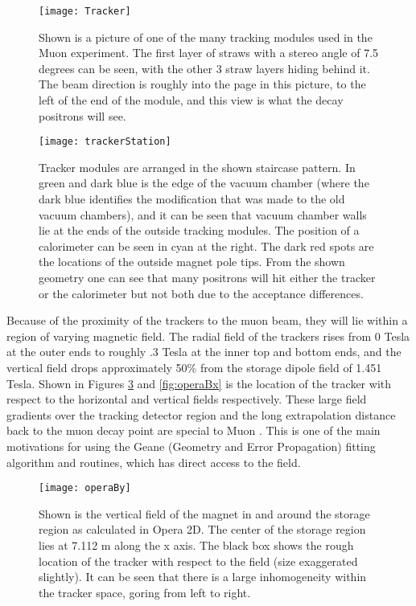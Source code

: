 \begin{figure}[]
\caption[Tracker module]{Shown is a picture of one of the many tracking modules used in the Muon \gmtwo experiment. The first layer of straws with a stereo angle of 7.5 degrees can be seen, with the other 3 straw layers hiding behind it. The beam direction is roughly into the page in this picture, to the left of the end of the module, and this view is what the decay positrons will see.}
\centering
\texttt{[image: Tracker]}
\label{fig:tracker}
\end{figure}

\begin{figure}[]
\caption[Tracker module arrangement]{Tracker modules are arranged in the shown staircase pattern. In green and dark blue is the edge of the vacuum chamber (where the dark blue identifies the modification that was made to the old vacuum chambers), and it can be seen that vacuum chamber walls lie at the ends of the outside tracking modules. The position of a calorimeter can be seen in cyan at the right. The dark red spots are the locations of the outside magnet pole tips. From the shown geometry one can see that many positrons will hit either the tracker or the calorimeter but not both due to the acceptance differences.}
\centering
\texttt{[image: trackerStation]}
\label{fig:staircase}
\end{figure}


  Because of the proximity of the trackers to the muon beam, they will lie within a region of varying magnetic field. The radial field of the trackers rises from 0 Tesla at the outer ends to roughly .3 Tesla at the inner top and bottom ends, and the vertical field drops approximately 50\% from the storage dipole field of 1.451 Tesla. Shown in Figures \ref{fig:operaBy} and \ref{fig:operaBx} is the location of the tracker with respect to the horizontal and vertical fields respectively. These large field gradients over the tracking detector region and the long extrapolation distance back to the muon decay point are special to Muon \gmtwo. This is one of the main motivations for using the Geane (Geometry and Error Propagation) fitting algorithm and routines, which has direct access to the field.

\begin{figure}[]
\caption[Vertical magnetic field from Opera2D]{Shown is the vertical field of the \gmtwo magnet in and around the storage region as calculated in Opera 2D. The center of the storage region lies at 7.112 m along the x axis. The black box shows the rough location of the tracker with respect to the field (size exaggerated slightly). It can be seen that there is a large inhomogeneity within the tracker space, goring from left to right.}
\centering
\texttt{[image: operaBy]}
\label{fig:operaBy}
\end{figure}

